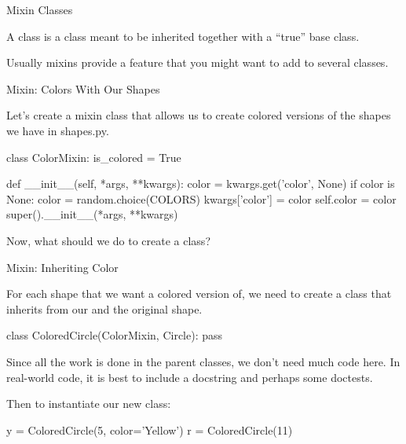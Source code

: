 \documentclass[aspectratio=169] {beamer}
\begin{document}
\begin{frame}{Mixin Classes}
  
  A  class is a class meant to be inherited together with a ``true'' base class.
  
  \bigskip
  
  Usually mixins provide a feature that you might want to add to several classes.
  
\end{frame}


\begin{frame}[fragile]{Mixin: Colors With Our Shapes}
  
  Let's create a mixin class that allows us to create colored versions of the shapes we have in shapes.py.
  
  \begin{pythoncode}
    class ColorMixin:
        is_colored = True
    
        def __init__(self, *args, **kwargs):
            color = kwargs.get('color', None)
            if color is None:
                color = random.choice(COLORS)
                kwargs['color'] = color
            self.color = color
            super().__init__(*args, **kwargs)
    
  \end{pythoncode}

  \pause \medskip
  
  Now, what should we do to create a  class?
  
\end{frame}


\begin{frame}[fragile]{Mixin: Inheriting Color}
  
  For each shape that we want a colored version of, 
  we need to create a class that inherits from our 
  and the original shape.
  
  \begin{pythoncode}
    class ColoredCircle(ColorMixin, Circle):
        pass

  \end{pythoncode}

  Since all the work is done in the parent classes,
  we don't need much code here.
  In real-world code, it is best to include a docstring and 
  perhaps some doctests.

  \pause \medskip
  
  Then to instantiate our new class:


  \begin{pythoncode}
    y = ColoredCircle(5, color='Yellow')
    r = ColoredCircle(11)
  \end{pythoncode}

\end{frame}
\end{document}
